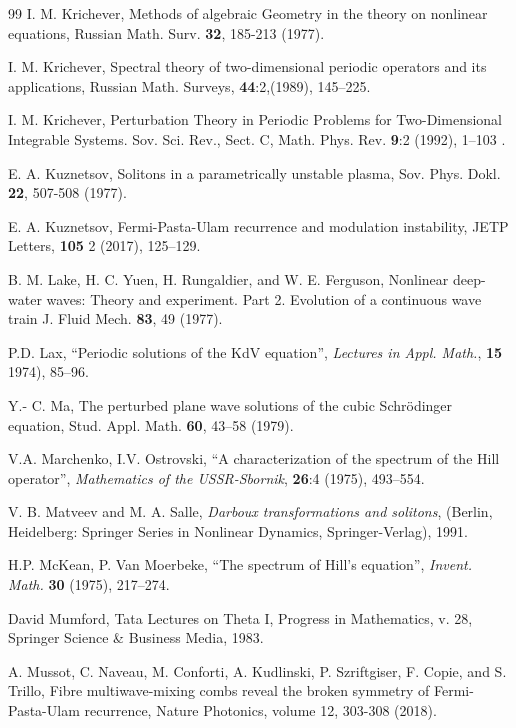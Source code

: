\documentclass[12pt]{article}
\begin{document}
\begin{thebibliography}{99}
 I. M. Krichever, Methods of algebraic Geometry in the theory on nonlinear equations, Russian Math. Surv. {\bf 32}, 185-213 (1977).

 I. M. Krichever, Spectral theory of two-dimensional periodic operators and its applications,
Russian  Math.  Surveys, \textbf{44}:2,(1989), 145--225.

 I. M. Krichever, Perturbation Theory in Periodic Problems for Two-Dimensional Integrable Systems.
Sov. Sci. Rev., Sect. C, Math. Phys. Rev. \textbf{9}:2 (1992), 1--103 .

 E. A. Kuznetsov, Solitons in a parametrically unstable plasma, Sov. Phys. Dokl. {\bf 22}, 507-508 (1977).

 E. A. Kuznetsov, Fermi-Pasta-Ulam recurrence and modulation instability, JETP Letters, {\bf 105} 2 (2017), 125--129.

 B. M. Lake, H. C. Yuen, H. Rungaldier, and W. E. Ferguson, Nonlinear deep-water waves: Theory and experiment. Part 2. Evolution of a continuous wave train J. Fluid Mech. {\bf 83}, 49 (1977).

 P.D. Lax, ``Periodic solutions of the KdV equation'', \textit{Lectures in Appl. Math.}, \textbf{15} 1974), 85--96.

 Y.- C. Ma, The perturbed plane wave solutions of the cubic Schrödinger equation, Stud. Appl. Math. {\bf 60}, 43--58 (1979). 

 V.A. Marchenko, I.V. Ostrovski, ``A characterization of the spectrum of the Hill operator'', \textit{Mathematics of the USSR-Sbornik}, \textbf{26}:4 (1975), 493--554.

 V. B. Matveev and M. A. Salle, {\it Darboux transformations and solitons}, (Berlin, Heidelberg: Springer Series in Nonlinear Dynamics, Springer-Verlag), 1991.

 H.P. McKean, P. Van Moerbeke, ``The spectrum of Hill’s equation'', \textit{Invent. Math.} \textbf{30} (1975), 217--274.

 David Mumford, Tata Lectures on Theta I, Progress in Mathematics, v. 28, Springer Science \& Business Media, 1983.

  A. Mussot, C. Naveau, M. Conforti, A. Kudlinski, P. Szriftgiser, F. Copie, and S. Trillo, Fibre multiwave-mixing combs reveal the broken symmetry of Fermi-Pasta-Ulam recurrence, Nature Photonics, volume 12, 303-308 (2018). 


\end{thebibliography}
\end{document}
